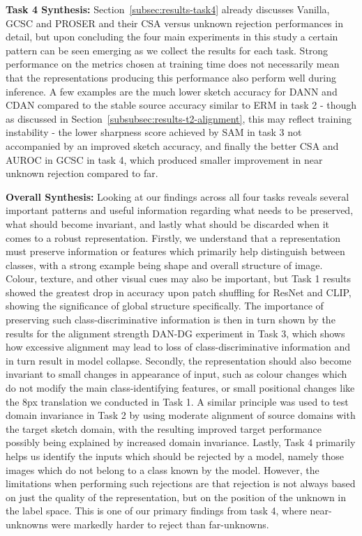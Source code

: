 \documentclass{article}
\begin{document}
\textbf{Task 4 Synthesis: }
Section~\ref{subsec:results-task4} already discusses Vanilla, GCSC and PROSER and their CSA versus unknown rejection performances in detail, but upon concluding the four main experiments in this study a certain pattern can be seen emerging as we collect the results for each task. Strong performance on the metrics chosen at training time does not necessarily mean that the representations producing this performance also perform well during inference. A few examples are the much lower sketch accuracy for DANN and CDAN compared to the stable source accuracy similar to ERM in task 2 - though as discussed in Section~\ref{subsubsec:results-t2-alignment}, this may reflect training instability - the lower sharpness score achieved by SAM in task 3 not accompanied by an improved sketch accuracy, and finally the better CSA and AUROC in GCSC in task 4, which produced smaller improvement in near unknown rejection compared to far.



\textbf{Overall Synthesis:}
Looking at our findings across all four tasks reveals several important patterns and useful information regarding what needs to be preserved, what should become invariant, and lastly what should be discarded when it comes to a robust representation. Firstly, we understand that a representation must preserve information or features which primarily help distinguish between classes, with a strong example being shape and overall structure of image. Colour, texture, and other visual cues may also be important, but Task 1 results showed the greatest drop in accuracy upon patch shuffling for ResNet and CLIP, showing the significance of global structure specifically. The importance of preserving such class-discriminative information is then in turn shown by the results for the alignment strength DAN-DG experiment in Task 3, which shows how excessive alignment may lead to loss of class-discriminative information and in turn result in model collapse. Secondly, the representation should also become invariant to small changes in appearance of input, such as colour changes which do not modify the main class-identifying features, or small positional changes like the 8px translation we conducted in Task 1. A similar principle was used to test domain invariance in Task 2 by using moderate alignment of source domains with the target sketch domain, with the resulting improved target performance possibly being explained by increased domain invariance.
Lastly, Task 4 primarily helps us identify the inputs which should be rejected by a model, namely those images which do not belong to a class known by the model. However, the limitations when performing such rejections are that rejection is not always based on just the quality of the representation, but on the position of the unknown in the label space. This is one of our primary findings from task 4, where near-unknowns were markedly harder to reject than far-unknowns.
\end{document}
